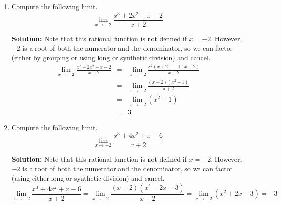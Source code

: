 \documentclass{article}
\begin{document}
\begin{enumerate}
  
\vspace{1cm}

\item Compute the following limit. \[ \lim_{x \rightarrow -2} \frac{x^3 + 2x^2 - x - 2}{x + 2} \]

\textbf{Solution:} Note that this rational function is not defined if $x = -2$. However, $-2$ is a root of both the numerator and the denominator, so we can factor (either by grouping or using long or synthetic division) and cancel.
\begin{eqnarray*}
\lim_{x \rightarrow -2} \frac{x^3 + 2x^2 - x - 2}{x + 2} & = & \lim_{x \rightarrow -2} \frac{x^2(x + 2) - 1(x + 2)}{x + 2} \\
 & = & \lim_{x \rightarrow -2} \frac{(x + 2)(x^2 - 1)}{x + 2} \\
 & = & \lim_{x \rightarrow -2} (x^2 - 1) \\
 & = & 3
\end{eqnarray*}


  
\vspace{1cm}

\item Compute the following limit. \[ \lim_{x \rightarrow -2} \frac{x^3 + 4x^2 + x - 6}{x + 2} \]

\textbf{Solution:} Note that this rational function is not defined if $x = -2$. However, $-2$ is a root of both the numerator and the denominator, so we can factor (using either long or synthetic division) and cancel.
\[ \lim_{x \rightarrow -2} \frac{x^3 + 4x^2 + x - 6}{x + 2} = \lim_{x \rightarrow -2} \frac{(x + 2)(x^2 + 2x - 3)}{x + 2} = \lim_{x \rightarrow -2} (x^2 + 2x - 3) = -3 \]


  
\vspace{1cm}
\end{enumerate}
\end{document}
